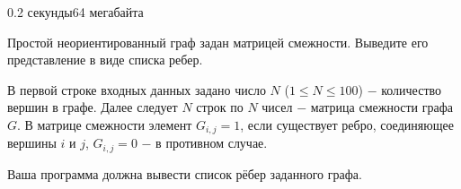 \begin{problem}{}{}{}{0.2 секунды}{64 мегабайта}

Простой неориентированный граф задан матрицей смежности. Выведите его представление в виде списка ребер.

\InputFile
В первой строке входных данных задано число $N$ ($1 \le N \le 100$) $-$ количество вершин в графе.
Далее следует $N$ строк по $N$ чисел $-$ матрица смежности графа $G$. В матрице смежности элемент $G_{i,j}=1$, если
существует ребро, соединяющее вершины $i$ и $j$, $G_{i,j}=0$ $-$ в противном случае.

\OutputFile
Ваша программа должна вывести список рёбер заданного графа.

\Example

\begin{example}
%
\end{example}

\end{problem}

